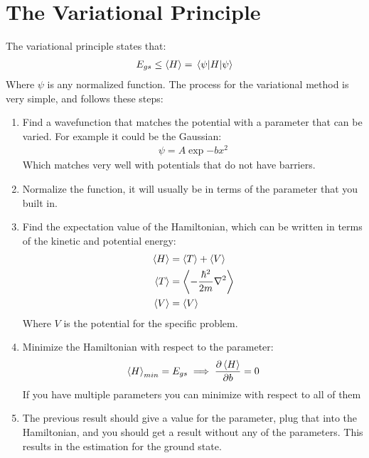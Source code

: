 \section{The Variational Principle}
The variational principle states that:
\begin{align*}
  E_{gs}\leq\ev{H}=\mel{\psi}{H}{\psi}
\end{align*}
Where $\psi$ is any normalized function.
The process for the variational method is very simple, and follows these steps:
\begin{enumerate}
\item Find a wavefunction that matches the potential with a parameter that can be varied. For example it could be the Gaussian:
  \begin{align*}
    \psi = A\exp{-bx^2}
  \end{align*}
Which matches very well with potentials that do not have barriers. 
\item Normalize the function, it will usually be in terms of the parameter that you built in.
\item Find the expectation value of the Hamiltonian, which can be written in terms of the kinetic and potential energy:
  \begin{align*}
    \ev{H}&=\ev{T}+\ev{V}\\
    \ev{T}&=\ev{-\frac{\hbar^2}{2m}\laplacian}\\
    \ev{V}&=\ev{V}
  \end{align*}
  Where $V$ is the potential for the specific problem.
\item Minimize the Hamiltonian with respect to the parameter:
  \begin{align*}
    \ev{H}_{min}=E_{gs}\implies \pdv{\ev{H}}{b}=0
  \end{align*}
  If you have multiple parameters you can minimize with respect to all of them
\item The previous result should give a value for the parameter, plug that into the Hamiltonian, and you should get a result without any of the parameters. This results in the estimation for the ground state. 
\end{enumerate}